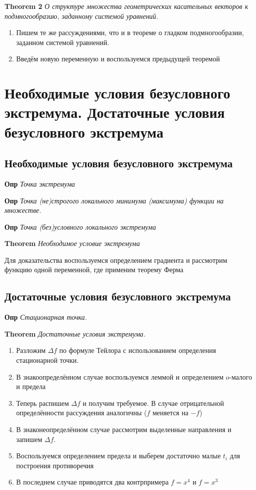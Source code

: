 \documentclass[a4paper, 14pt]{article}
\begin{document}
    \textbf{Theorem 2} \textit{О структуре множества геометрических касательных векторов к подмногообразию, заданному
    системой уравнений.}
    
    \begin{enumerate}
        \item Пишем те же рассуждениями, что и в теореме о гладком подмногообразии, заданном системой уравнений.
        \item Введём новую переменную и воспользуемся предыдущей теоремой
    \end{enumerate}
    
    \section{Необходимые условия безусловного экстремума.
    Достаточные условия безусловного экстремума}
    
    \subsection{Необходимые условия безусловного экстремума}
    
    \textbf{Опр} \textit{Точка экстремума}
    
    \textbf{Опр} \textit{Точка (не)строгого локального минимума (максимума) функции на множестве.}
    
    \textbf{Опр} \textit{Точка (без)условного локального экстремума}
    
    \textbf{Theorem} \textit{Необходимое условие экстремума}
    
    Для доказательства воспользуемся определением градиента и рассмотрим функцию одной переменной, где применим теорему
    Ферма
    
    \subsection{Достаточные условия безусловного экстремума}
    
    \textbf{Опр} \textit{Стационарная точка.}
    
    \textbf{Theorem} \textit{Достаточные условия экстремума.}
    
    \begin{enumerate}
        \item Разложим $\Delta f$ по формуле Тейлора с использованием определения стационарной точки.
        \item В знакоопределённом случае воспользуемся леммой и определением $o$-малого и предела
        \item Теперь распишем $\Delta f$ и получим требуемое.
        В случае отрицательной определённости рассуждения аналогичны ($f$ меняется на $-f$)
        \item В знаконеопределённом случае рассмотрим выделенные направления и запишем $\Delta f$.
        \item Воспользуемся определением предела и выберем достаточно малые $t_i$ для построения противоречия
        \item В последнем случае приводятся два контрпримера $f = x^4$ и $f = x^3$
    \end{enumerate}
    
\end{document}

